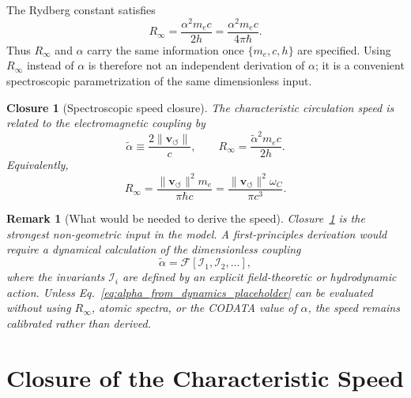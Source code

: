 \documentclass[aps,pra,preprint,longbibliography,nofootinbib]{revtex4-2}
\newtheorem{remark}{Remark}
\newtheorem{closure}{Closure}
\newcommand{\vnorm}{\lVert\mathbf{v}_{\!\boldsymbol{\circlearrowleft}}\rVert} %
\begin{document}
The Rydberg constant satisfies
\begin{equation}
  R_\infty = \frac{\alpha^2 m_e c}{2h}
           = \frac{\alpha^2 m_e c}{4\pi\hbar}.
  \label{eq:Rydberg_standard}
\end{equation}
Thus $R_\infty$ and $\alpha$ carry the same information once
$\{m_e,c,h\}$ are specified.  Using $R_\infty$ instead of $\alpha$ is
therefore not an independent derivation of $\alpha$; it is a convenient
spectroscopic parametrization of the same dimensionless input.

\begin{closure}[Spectroscopic speed closure]
\label{cl:speed}
The characteristic circulation speed is related to the electromagnetic
coupling by
\begin{equation}
  \tilde\alpha \equiv \frac{2\vnorm}{c},
  \qquad
  R_\infty = \frac{\tilde\alpha^2 m_e c}{2h}.
  \label{eq:speed_closure}
\end{equation}
Equivalently,
\begin{equation}
  R_\infty = \frac{\vnorm^2 m_e}{\pi\hbar c}
           = \frac{\vnorm^2\omega_C}{\pi c^3}.
  \label{eq:rydberg_core}
\end{equation}
\end{closure}

\begin{remark}[What would be needed to derive the speed]
\label{rem:derive_speed}
Closure~\ref{cl:speed} is the strongest non-geometric input in the
model.  A first-principles derivation would require a dynamical
calculation of the dimensionless coupling
\begin{equation}
  \tilde\alpha = \mathcal{F}[\mathcal{I}_1,\mathcal{I}_2,\ldots],
  \label{eq:alpha_from_dynamics_placeholder}
\end{equation}
where the invariants $\mathcal{I}_i$ are defined by an explicit
field-theoretic or hydrodynamic action.  Unless Eq.~\eqref{eq:alpha_from_dynamics_placeholder}
can be evaluated without using $R_\infty$, atomic spectra, or the
CODATA value of $\alpha$, the speed remains calibrated rather than
derived.
\end{remark}

\section{Closure of the Characteristic Speed}
\label{sec:derivation}
\end{document}
